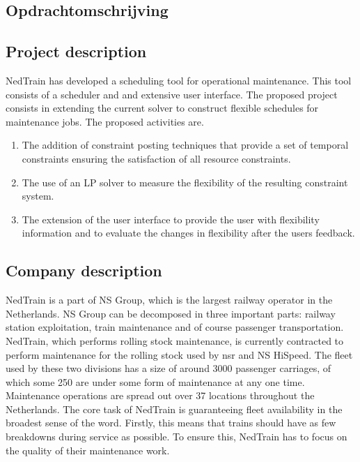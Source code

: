 \begin{appendices}
\section{Opdrachtomschrijving} \label{app:A}
\subsection*{Project description}
NedTrain has developed a scheduling tool for operational maintenance. This tool consists of a scheduler and and extensive user interface. The proposed project consists in extending the current solver to construct flexible schedules for maintenance jobs. The proposed activities are.

\begin{enumerate}
	\item The addition of constraint posting techniques that provide a set of temporal constraints ensuring the satisfaction of all resource constraints.
	\item The use of an LP solver to measure the flexibility of the resulting constraint system.
	\item The extension of the user interface to provide the user with flexibility information and to evaluate the changes in flexibility after the users feedback.
\end{enumerate}

\subsection*{Company description}

NedTrain is a part of NS Group, which is the largest railway operator in the Netherlands. NS Group can be decomposed in three important parts: railway station exploitation, train maintenance and of course passenger transportation. NedTrain, which performs rolling stock maintenance, is currently contracted to perform maintenance for the rolling stock used by nsr and NS HiSpeed. The fleet used by these two divisions has a size of around 3000 passenger carriages, of which some 250 are under some form of maintenance at any one time. Maintenance operations are spread out over 37 locations throughout the Netherlands. The core task of NedTrain is guaranteeing fleet availability in the broadest sense of the word. Firstly, this means that trains should have as few breakdowns during service as possible. To ensure this, NedTrain has to focus on the quality of their maintenance work.


\end{appendices}
